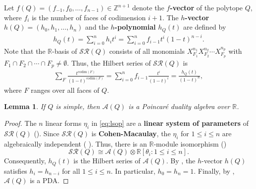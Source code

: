 \documentclass{amsart}
\theoremstyle{plain} \numberwithin{equation}{section}
\newtheorem{lemma}[theorem]{Lemma}
\theoremstyle{definition}
\newcommand{\R}{\mathbb{R}}
\newcommand{\Z}{\mathbb{Z}}
\begin{document}
Let $f(Q)=(f_{-1},f_0,\ldots,f_{n-1})\in \Z^{n+1}$ denote the \textbf{$f$-vector} of the polytope $Q$, 
where $f_i$ is the number of faces of codimension $i+1$. 
The \textbf{$h$-vector} $h(Q)=(h_0,h_1,\ldots,h_n)$ and the \textbf{$h$-polynomial} $h_Q(t)$  are defined by 
\begin{align*}
  h_Q(t)=\sum_{i=0}^nh_it^i=\sum_{i=0}^nf_{i-1}t^i(1-t)^{n-i}.
\end{align*}
Note that the $\R$-basis of $\mathcal{SR}(Q)$ consists of all monomials $X_{F_{1}}^{n_1}X_{F_{2}}^{n_2}\cdots X_{F_{p}}^{n_p}$ with $F_{1}\cap F_{2}\cap\cdots\cap F_{p}\ne\emptyset$. 
Thus, the Hilbert series of  $\mathcal{SR}(Q)$ is 
\begin{align*}
  \sum_{F}\frac{t^{\mathrm{codim}(F)}}{(1-t)^{\mathrm{codim}(F)}}=\sum_{i=0}^nf_{i-1}\frac{t^i}{(1-t)^{i}}=\frac{h_Q(t)}{(1-t)^n},
\end{align*}
where $F$ ranges over all faces of $Q$.


\begin{lemma}\label{lem:isPDA}
 If $Q$ is simple, then $\mathcal{A}(Q)$ is a Poincar\'{e}  duality algebra over $\R$.
\end{lemma}
\begin{proof}
  The $n$ linear forms $\eta_i$ in \cref{eq:lsop} are a \textbf{linear system of parameters} of $\mathcal{SR}(Q)$ (\cite[remark (p.150)]{stanleyBalancedCohenmacaulayComplexes1979}). 
  Since $\mathcal{SR}(Q)$ is \textbf{Cohen-Macaulay}, the $\eta_i$ for $1\leq i\leq n$ are algebraically independent (\cite[Corollary II.4.4]{stanleyCombinatoricsCommutativeAlgebra1996}
  ). Thus, there is an $\R$-module isomorphism (\cite[Corollary I.5.10]{stanleyCombinatoricsCommutativeAlgebra1996})
  $$
  \mathcal{SR}(Q)\cong \mathcal{A}(Q)\otimes\R[\theta_i:1\leq i\leq n].
  $$
  Consequently, $h_Q(t)$ is the Hilbert series of $\mathcal{A}(Q)$.
By \cite[Theorem II.1.3, Corollary II.5.2, p. 67]{stanleyCombinatoricsCommutativeAlgebra1996}, 
the $h$-vector $h(Q)$ satisfies $h_i=h_{n-i}$ for all $1\leq i\leq n$. In particular, $h_0=h_n=1$.
Finally,  by \cite[Remark 2.11.4, Theorem 2.79]{harimaLefschetzProperties2013}, $\mathcal{A}(Q)$ is a  PDA.
\qedhere
\end{proof}
\end{document}
